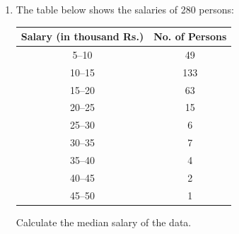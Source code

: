 \begin{enumerate}[label=\thesubsection.\arabic*, ref=\thesubsection.\theenumi]
\begin{enumerate}[label=(\alph*), leftmargin=1.5em, labelsep=0.5em]
From \eqref{eq:EE26BTECH11225-cone-vol}, the volume of the conical heap of rice is:
\begin{align}
    V &= \frac{1}{3} \pi r^2 h \\
    &= \frac{1}{3} \times \frac{22}{7} \times (12)^2 \times \frac{7}{2} \\
    &= \frac{1}{3} \times \frac{22}{7} \times 144 \times \frac{7}{2} \\
    &= 11 \times 48 = 528\text{ m}^3
\end{align}

To find the canvas cloth required to cover the heap, from \eqref{eq:EE26BTECH11225-cone-csa} we calculate the curved surface area ($\text{CSA} = \pi r l$), where $l$ is the slant height:
\begin{align}
    l &= \sqrt{r^2 + h^2} = \sqrt{12^2 + (3.5)^2} \\
    &= \sqrt{144 + 12.25} = \sqrt{156.25} = 12.5\text{ m}
\end{align}

Area of canvas cloth required:
\begin{align}
    \text{CSA} &= \pi r l \\
    &= \frac{22}{7} \times 12 \times 12.5 \\
    &= \frac{22 \times 150}{7} = \frac{3300}{7} \approx 471.43\text{ m}^2
\end{align}
Thus, the volume of rice is $528\text{ m}^3$ and the area of canvas cloth required is $471.43\text{ m}^2$.     
    \end{enumerate}
    \item The table below shows the salaries of 280 persons:
    \begin{center}
    \begin{tabular}{|c|c|}
    \hline
    \textbf{Salary (in thousand Rs.)} & \textbf{No. of Persons} \\
    \hline
    5--10  & 49  \\
    10--15 & 133 \\
    15--20 & 63  \\
    20--25 & 15  \\
    25--30 & 6   \\
    30--35 & 7   \\
    35--40 & 4   \\
    40--45 & 2   \\
    45--50 & 1   \\
    \hline
    \end{tabular}
    \end{center}
    Calculate the median salary of the data.


\end{enumerate}
